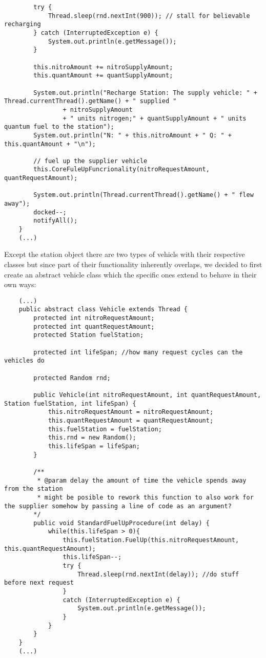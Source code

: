 \documentclass[a4paper,11pt]{article}
\begin{document}
\begin{verbatim}
        try {
            Thread.sleep(rnd.nextInt(900)); // stall for believable recharging
        } catch (InterruptedException e) {
            System.out.println(e.getMessage());
        }

        this.nitroAmount += nitroSupplyAmount;
        this.quantAmount += quantSupplyAmount;

        System.out.println("Recharge Station: The supply vehicle: " + Thread.currentThread().getName() + " supplied "
                + nitroSupplyAmount
                + " units nitrogen;" + quantSupplyAmount + " units quantum fuel to the station");
        System.out.println("N: " + this.nitroAmount + " Q: " + this.quantAmount + "\n");

        // fuel up the supplier vehicle
        this.CoreFuleUpFuncrionality(nitroRequestAmount, quantRequestAmount);

        System.out.println(Thread.currentThread().getName() + " flew away");
        docked--;
        notifyAll();
    }
    (...)
\end{verbatim}

Except the station object there are two types of vehicls with their respective classes but since part of their functionality inherently overlaps, we decided to first create an abstract vehicle class which the specific ones extend to behave in their own ways:

\begin{verbatim}
    (...)
    public abstract class Vehicle extends Thread {
        protected int nitroRequestAmount;
        protected int quantRequestAmount;
        protected Station fuelStation;
    
        protected int lifeSpan; //how many request cycles can the vehicles do
    
        protected Random rnd;
    
        public Vehicle(int nitroRequestAmount, int quantRequestAmount, Station fuelStation, int lifeSpan) {
            this.nitroRequestAmount = nitroRequestAmount;
            this.quantRequestAmount = quantRequestAmount;
            this.fuelStation = fuelStation;
            this.rnd = new Random();
            this.lifeSpan = lifeSpan;
        }
    
        /**
         * @param delay the amount of time the vehicle spends away from the station
         * might be posible to rework this function to also work for the supplier somehow by passing a line of code as an argument?
        */
        public void StandardFuelUpProcedure(int delay) {
            while(this.lifeSpan > 0){
                this.fuelStation.FuelUp(this.nitroRequestAmount, this.quantRequestAmount);
                this.lifeSpan--;
                try {
                    Thread.sleep(rnd.nextInt(delay)); //do stuff before next request
                } 
                catch (InterruptedException e) {
                    System.out.println(e.getMessage());
                }
            }
        }
    }
    (...)
\end{verbatim}
\end{document}
